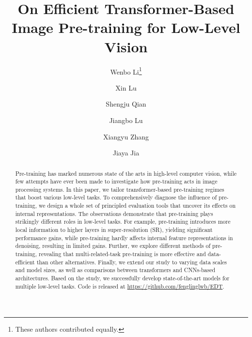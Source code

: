 \documentclass[runningheads]{llncs}
\makeatletter
\newcommand{\printfnsymbol}[1]{\textsuperscript{\@fnsymbol{#1}}}
\makeatother
\begin{document}
\pagestyle{headings}
	\mainmatter
	\def\ECCVSubNumber{112}  

	\title{On Efficient Transformer-Based Image Pre-training for Low-Level Vision
	\vspace{-0.1in}} 

\begin{comment}
	\titlerunning{ECCV-22 submission ID \ECCVSubNumber} 
	\authorrunning{ECCV-22 submission ID \ECCVSubNumber} 
	\author{Anonymous ECCV submission}
	\institute{Paper ID \ECCVSubNumber}
	\end{comment}






	\author{Wenbo Li\thanks{These authors contributed equally.} \and Xin Lu\printfnsymbol{1} \and Shengju Qian \and Jiangbo Lu \and Xiangyu Zhang \and Jiaya Jia}
	\maketitle
	
	\begin{abstract}
		Pre-training has marked numerous state of the arts in high-level computer vision, while few attempts have ever been made to investigate how pre-training acts in image processing systems. In this paper, we tailor transformer-based pre-training regimes that boost various low-level tasks. To comprehensively diagnose the influence of pre-training, we design a whole set of principled evaluation tools that uncover its effects on internal representations. The observations demonstrate that pre-training plays strikingly different roles in low-level tasks. For example, pre-training introduces more local information to higher layers in super-resolution (SR), yielding significant performance gains, while pre-training hardly affects internal feature representations in denoising, resulting in limited gains. Further, we explore different methods of pre-training, revealing that multi-related-task pre-training is more effective and data-efficient than other alternatives. Finally, we extend our study to varying data scales and model sizes, as well as comparisons between transformers and CNNs-based architectures. Based on the study, we successfully develop state-of-the-art models for multiple low-level tasks. Code is released at \url{https://github.com/fenglinglwb/EDT}.
		


		
	\end{abstract}
	\vspace{-0.25in}
	
\end{document}
